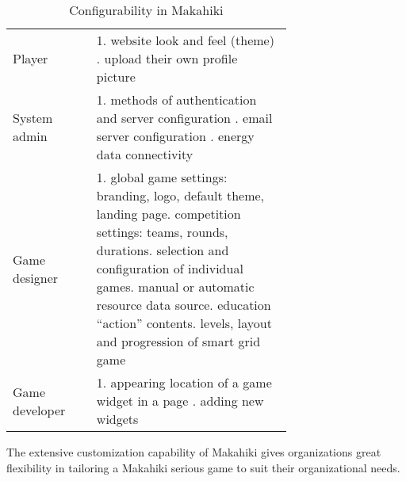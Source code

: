 \begin{table}[ht!]
  \centering
  \begin{tabular} {|l|P{0.7\linewidth}|}
    \hline
     &
      \\
    \hline
    Player & 1. website look and feel (theme) . upload their own profile picture\\
    \hline 
    System admin 
    & 1. methods of authentication and server configuration . email server configuration . energy data connectivity \\
    \hline 
    Game designer 
    & 1. global game settings: branding, logo, default theme, landing page. competition settings: teams, rounds, durations. selection and configuration of individual games. manual or automatic resource data source. education ``action'' contents. levels, layout and progression of smart grid game\\
    \hline 
     Game developer
    & 1. appearing location of a game widget in a page . adding new widgets\\
    \hline
  \end{tabular}
  \caption{Configurability in Makahiki}
  \label{table:makahiki-configurability}
\end{table}

The extensive customization capability of Makahiki gives organizations great flexibility in tailoring a Makahiki serious game to suit their organizational needs. 
